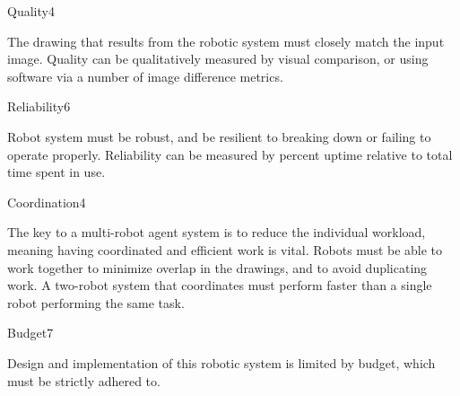 \begin{nonfunctional_requirement}{Quality}{4}
\label{nfr:quality}
\item The drawing that results from the robotic system must closely match the input image. Quality can be qualitatively measured by visual comparison, or using software via a number of image difference metrics.
\end{nonfunctional_requirement}


\begin{nonfunctional_requirement}{Reliability}{6}
\label{nfr:reliability}
\item Robot system must be robust, and be resilient to breaking down or failing to operate properly. Reliability can be measured by percent uptime relative to total time spent in use.
\end{nonfunctional_requirement}


\begin{nonfunctional_requirement}{Coordination}{4}
\label{nfr:coordination}
\item The key to a multi-robot agent system is to reduce the individual workload, meaning having coordinated and efficient work is vital. Robots must be able to work together to minimize overlap in the drawings, and to avoid duplicating work. A two-robot system that coordinates must perform faster than a single robot performing the same task.
\end{nonfunctional_requirement}

\begin{nonfunctional_requirement}{Budget}{7}
\label{nfr:budget}
\item Design and implementation of this robotic system is limited by budget, which must be strictly adhered to. 
\end{nonfunctional_requirement}

